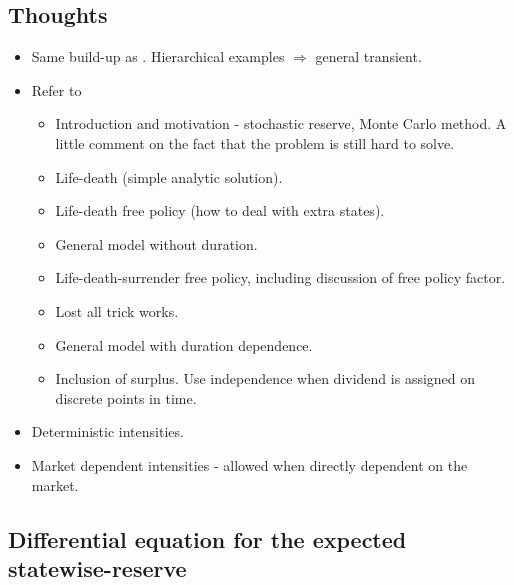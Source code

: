 \documentclass[12pt]{article}
\begin{document}
\subsection*{Thoughts}
\begin{itemize}
\item Same build-up as \citet{THM_BUC}. Hierarchical examples $\Rightarrow$ general transient.
\item Refer to \citet{Norberg}
\begin{itemize}
\item Introduction and motivation - stochastic reserve, Monte Carlo method. A little comment on the fact that the problem is still hard to solve.
\item Life-death (simple analytic solution).
\item Life-death free policy (how to deal with extra states).
\item General model without duration.
\item Life-death-surrender free policy, including discussion of free policy factor.
\item Lost all trick works.
\item General model with duration dependence.
\item Inclusion of surplus. Use independence when dividend is assigned on discrete points in time.
\end{itemize}
\item Deterministic intensities.
\item Market dependent intensities - allowed when directly dependent on the market.
\end{itemize}


\subsection*{Differential equation for the expected statewise-reserve}
\end{document}
